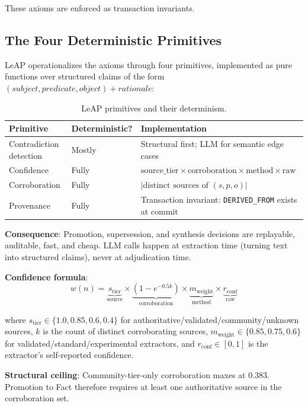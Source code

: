 \documentclass[11pt,letterpaper]{article}
\begin{document}
These axioms are enforced as transaction invariants.

\subsection{The Four Deterministic Primitives}

LeAP operationalizes the axioms through four primitives, implemented as pure functions over structured claims of the form $(subject, predicate, object) + rationale$:

\begin{table}[H]
\centering
\caption{LeAP primitives and their determinism.}
\label{tab:primitives}
\begin{tabular}{@{}lll@{}}
\toprule
\textbf{Primitive} & \textbf{Deterministic?} & \textbf{Implementation} \\
\midrule
Contradiction detection & Mostly & Structural first; LLM for semantic edge cases \\
Confidence & Fully & $\text{source\_tier} \times \text{corroboration} \times \text{method} \times \text{raw}$ \\
Corroboration & Fully & $|\text{distinct sources of } (s, p, o)|$ \\
Provenance & Fully & Transaction invariant: \texttt{DERIVED\_FROM} exists at commit \\
\bottomrule
\end{tabular}
\end{table}

\textbf{Consequence}: Promotion, supersession, and synthesis decisions are replayable, auditable, fast, and cheap. LLM calls happen at extraction time (turning text into structured claims), never at adjudication time.

\textbf{Confidence formula}:
\[
w(n) = \underbrace{s_{\text{tier}}}_{\text{source}} \times \underbrace{(1 - e^{-0.5k})}_{\text{corroboration}} \times \underbrace{m_{\text{weight}}}_{\text{method}} \times \underbrace{r_{\text{conf}}}_{\text{raw}}
\]

where $s_{\text{tier}} \in \{1.0, 0.85, 0.6, 0.4\}$ for authoritative/validated/community/unknown sources, $k$ is the count of distinct corroborating sources, $m_{\text{weight}} \in \{0.85, 0.75, 0.6\}$ for validated/standard/experimental extractors, and $r_{\text{conf}} \in [0,1]$ is the extractor's self-reported confidence.

\textbf{Structural ceiling}: Community-tier-only corroboration maxes at 0.383. Promotion to Fact therefore requires at least one authoritative source in the corroboration set.
\end{document}
